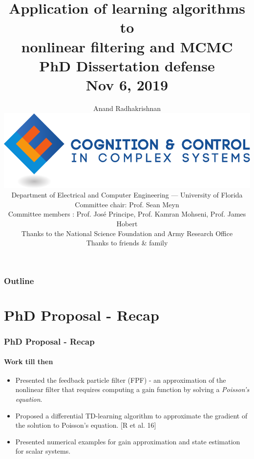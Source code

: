 \documentclass[xcolor=dvipsnames, subsection=false]{beamer}
\def\alertb#1{\alert{\color{BrickRed}  #1}}
\def\alertc#1{\alert{\color{MyDarkBlue}  #1}}
\def\alertb#1{\alert{\color{BrickRed}  #1}}
\def\alertc#1{\alert{\color{MyDarkBlue}  #1}}
\def\bl#1{{\color{blue}#1}}
\begin{document}
\thispagestyle{empty}
\setcounter{page}{0}



\title{\Large
	\textbf{Application of learning algorithms to
		\\
		nonlinear filtering and MCMC}
	\\[.5em]
	\normalsize
	PhD Dissertation defense
	\\[.5em]
	\scriptsize
	Nov 6, 2019}

\author{
	\small Anand Radhakrishnan
	\\[.2cm]
	\href{http://ccc.centers.ufl.edu/}{\includegraphics[width=.2\hsize]{c3logocmyk.pdf}}
	\\[.2cm]
	\small
	\scriptsize
	Department of Electrical and Computer Engineering
	---
	University of Florida
	\\[.3cm]\color{Sepia}
	\scriptsize
	Committee chair: \alertc{Prof. Sean Meyn}
	\\[.25cm]
	Committee members : \alertc{Prof. Jos\'{e} Principe, Prof. Kamran Mohseni, Prof. James Hobert}
	\\[.25cm]
	\scriptsize \color{Sepia} 
	Thanks to the National Science Foundation and Army Research Office \\
   \scriptsize \color{Sepia}
   Thanks to friends \& family}
\date{}

\frame{\titlepage}

\begin{frame}
  \thispagestyle{empty}
  \setcounter{framenumber}{0}

  \frametitle{Outline}
  \framesubtitle{}
  \tableofcontents
\end{frame}

\section{PhD Proposal - Recap}
\begin{frame}
\frametitle{PhD Proposal - Recap}
\framesubtitle{Work till then}
\begin{itemize}
	\item Presented the \alertb{feedback particle filter (FPF)} - an approximation of the nonlinear filter that requires computing a gain function by solving a \textit{Poisson's equation}. 
	\item Proposed a \alertb{differential TD-learning} algorithm to approximate the gradient of the solution to Poisson's equation. {\footnotesize\bl{[R et al. 16]}} \pause
	\item Presented numerical examples for gain approximation and state estimation for scalar systems.
\end{itemize}
\end{frame}
\end{document}
